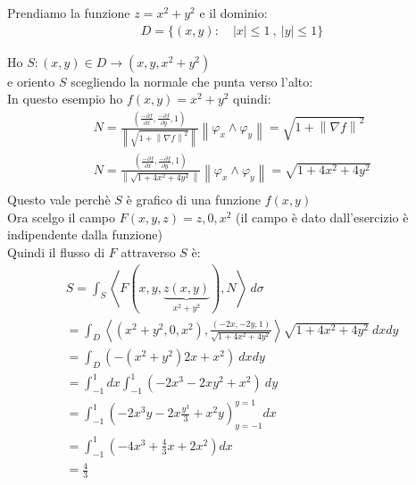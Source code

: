 \documentclass[a4paper, oneside]{article}
\newcommand{\tab}{\hspace*{2em}}
\begin{document}
\begin{example}
  Prendiamo la funzione $z = x^2 + y^2$
  e il dominio:
  \begin{gather*}
    D = \{ (x,y) : \quad |x| \leq 1 \ , \ |y| \leq 1 \}
  \end{gather*}

    \begin{center}
    \end{center}

    Ho $S: (x,y) \in D \to (x,y,x^2+y^2)$\\
    e oriento $S$ scegliendo la normale che punta verso l'alto:\\
    In questo esempio ho $f(x,y) = x^2+ y^2$ quindi:
    \begin{gather*}
      N = \frac{\left(\frac{-\partial f}{\partial x} , \frac{-\partial f}{\partial y} , 1\right) }{\left\lVert \sqrt{1+ \left\lVert \nabla f\right\rVert^2 } \right\rVert} \left\lVert \varphi_x \land \varphi_y \right\rVert = \sqrt{1 + \left\lVert \nabla f\right\rVert^2 }\\
      N = \frac{\left(\frac{-\partial f}{\partial x} , \frac{-\partial f}{\partial y} , 1\right) }{\left\lVert \sqrt{1+ 4x^2 + 4y^2} \right\rVert} \left\lVert \varphi_x \land \varphi_y \right\rVert = \sqrt{1 + 4x^2 + 4y^2 }\\
    \end{gather*}
    Questo vale perchè $S$ è grafico di una funzione $f(x,y)$\\
    Ora scelgo il campo $F(x,y,z) = z, 0, x^2$ \tab \tiny (il campo è dato dall'esercizio è indipendente dalla funzione) \normalsize\\
    Quindi il flusso di $F$ attraverso $S$ è:
    \begin{gather*}
      S = \int_S \left\langle F(x,y,\underbrace{z(x,y)}_{x^2+y^2}) , N \right\rangle \ d\sigma \\
      = \int_D \left\langle \left(x^2+y^2, 0, x^2\right) , \frac{(-2x, -2y, 1)}{\sqrt{1 + 4x^2 + 4y^2}}  \right\rangle \sqrt{1 + 4x^2 + 4y^2} \ dx dy\\
      = \int_D \left( -(x^2+y^2)2x + x^2 \right) \ dxdy\\
      = \int_{-1}^1 dx \int_{-1}^1 \left( -2x^3 - 2xy^2 + x^2 \right) \ dy\\
      = \int_{-1}^1 \left( -2x^3 y - 2x \frac{y^3}{3} + x^2 y \right)_{y=-1}^{y=1} dx\\
      = \int_{-1}^1 \left( -4x^3 + \frac{4}{3} x + 2x^2 \right) dx\\
      = \frac{4}{3}
    \end{gather*}
\end{example}
\end{document}

